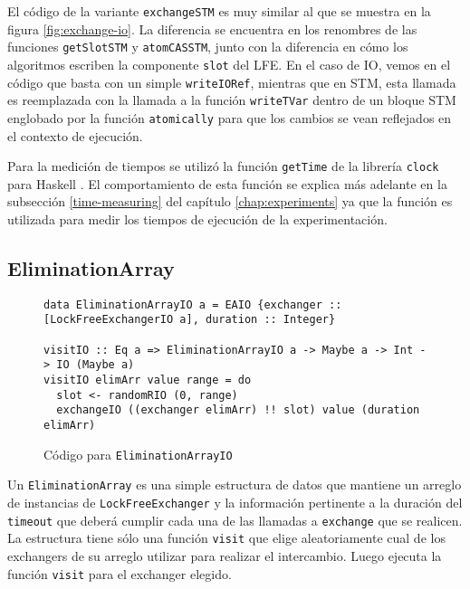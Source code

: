 El código de la variante \texttt{exchangeSTM} es muy similar al que se muestra en la figura \ref{fig:exchange-io}. La diferencia se encuentra en los renombres de las funciones \texttt{getSlotSTM} y \texttt{atomCASSTM}, junto con la diferencia en cómo los algoritmos escriben la componente \texttt{slot} del LFE. En el caso de IO, vemos en el código que basta con un simple \texttt{writeIORef}, mientras que en STM, esta llamada es reemplazada con la llamada a la función \texttt{writeTVar} dentro de un bloque STM englobado por la función \texttt{atomically} para que los cambios se vean reflejados en el contexto de ejecución.

Para la medición de tiempos se utilizó la función \texttt{getTime} de la librería \texttt{clock} para Haskell \cite{timeMeasuring}. El comportamiento de esta función se explica más adelante en la subsección \ref{time-measuring} del capítulo \ref{chap:experiments} ya que la función es utilizada para medir los tiempos de ejecución de la experimentación.

\subsection{EliminationArray}
\begin{figure}[t]
  \centering
  \begin{verbatim}
data EliminationArrayIO a = EAIO {exchanger :: [LockFreeExchangerIO a], duration :: Integer}

visitIO :: Eq a => EliminationArrayIO a -> Maybe a -> Int -> IO (Maybe a)
visitIO elimArr value range = do
  slot <- randomRIO (0, range)
  exchangeIO ((exchanger elimArr) !! slot) value (duration elimArr)
  \end{verbatim}
  \caption{Código para \texttt{EliminationArrayIO}}
  \label{fig:elimArr}
\end{figure}

Un \texttt{EliminationArray} es una simple estructura de datos que mantiene un arreglo de instancias de \texttt{LockFreeExchanger} y la información pertinente a la duración del \texttt{timeout} que deberá cumplir cada una de las llamadas a \texttt{exchange} que se realicen.
La estructura tiene sólo una función \texttt{visit} que elige aleatoriamente cual de los exchangers de su arreglo utilizar para realizar el intercambio. Luego ejecuta la función \texttt{visit} para el exchanger elegido.

